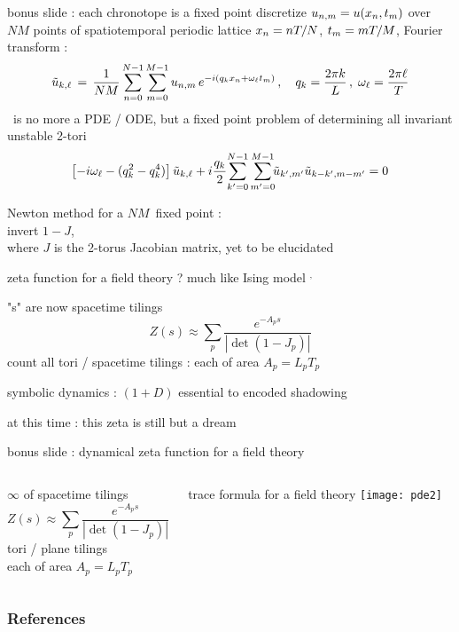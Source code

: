 \begin{frame}{bonus slide : each chronotope is a fixed point}
discretize $u_{n,m} = u(x_n,t_m)$ over
$N M$ points of spatiotemporal periodic lattice $x_n = n {T_{}}/N$,
 $t_m = m {T_{}}/M$, Fourier transform :
%
\[
\tilde{u}_{k,\ell} \,=\,
  \frac{1}{NM} \sum^{N-1}_{n=0} \sum^{M-1}_{m=0}
  u_{n,m} \, e^{-i(q_kx_n + \omega_\ell t_m)}
    \,,\quad
q_k = \frac{2 \pi k}{L}
    \,,\;
\omega_\ell = \frac{2 \pi \ell}{{T_{}}}
\]
\KS\ is no more a PDE / ODE, but a fixed point problem of
determining all invariant unstable 2-tori
\[
\left[- i \omega_\ell - ( q_k^2 - q_k^4 ) \right]\tilde{u}_{k,\ell}
+ i \frac{q_k}{2} \!\sum_{k'=0}^{N-1} \sum^{M-1}_{m'=0}\!\!
\tilde{u}_{k',m'} \tilde{u}_{k-k',m-m'}
    =
0
\]

\bigskip

Newton method for a $NM$\dmn\ fixed point :
\\ invert $1-J$,
\\ where $J$ is the
2-torus Jacobian matrix, yet to be elucidated
\end{frame}


\begin{frame}{zeta function for a field theory ? much like Ising model
    $^,$
}
\begin{block}{"\po s" are now spacetime tilings}
\[
Z(s) \approx
\sum_{p} \frac{e^{-A_p s}}
              {\left|\det(1-J_p)\right|}
\]
count all tori / spacetime tilings :
each of area $A_p = L_p T_p$
\end{block}
\begin{block}{symbolic dynamics : $(1+D)$\dmn}
essential to encoded shadowing
\end{block}

\vfill
at this time : this zeta is still but a dream
\end{frame}

\begin{frame}{bonus slide : dynamical zeta function for a field theory}
  \begin{columns}
\begin{block}{$\infty$ of spacetime tilings}
\[
Z(s) \approx
\sum_{p} \frac{e^{-A_p s}}
              {\left|\det(1-J_p)\right|}
\]
tori / plane tilings
\\
each of area $A_p = L_p T_p$
\end{block}
\begin{block}{trace formula  for a field theory}
\texttt{[image: pde2]}%
\end{block}
  \end{columns}
\end{frame}


\begin{frame}[t, allowframebreaks]
  \frametitle{References}
  \scriptsize{ %
  \printbibliography
   } %
\end{frame}


